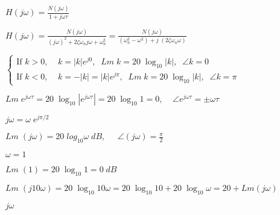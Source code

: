 \documentclass{article}
\def\lthtmlcheckvsize{\ifdim\ht\sizebox<\vsize 
  \ifdim\wd\sizebox<\hsize\expandafter\hfill\fi \expandafter\vfill
  \else\expandafter\vss\fi}%
\begin{document}
{\newpage\clearpage
{}%
$\displaystyle H(j\omega)=\frac{N(j\omega)}{1+j\omega \tau} $%
\lthtmlindisplaymathZ
\lthtmlcheckvsize\clearpage}

{\newpage\clearpage
{}%
$\displaystyle H(j\omega)=\frac{N(j\omega)}{(j\omega)^2+2\zeta\omega_n j\omega +\omega_n^2}
=\frac{N(j\omega)}{(\omega_n^2-\omega^2)+j\;(2\zeta\omega_n \omega) }$%
\lthtmlindisplaymathZ
\lthtmlcheckvsize\clearpage}

{\newpage\clearpage
{}%
$\displaystyle \left\{ \begin{array}{l}
    \mbox{If $k>0, \;\;\;\;k=|k|e^{j0}, \;\;Lm\;k=20 \;\log_{10}|k|,\;\;\angle k=0$} \\
    \mbox{If $k<0, \;\;\;\;k=-|k|=|k|e^{j\pi}, \;\;Lm\;k=20\;\log_{10}|k|,\;\;\angle k=\pi$} 
    \end{array} \right. $%
\lthtmlindisplaymathZ
\lthtmlcheckvsize\clearpage}

{\newpage\clearpage
{}%
$\displaystyle Lm \;e^{ j\omega \tau}=20\;\log_{10} |e^{ j\omega \tau}|=20\;\log_{10} 1=0,\;\;\;\;
  \angle e^{ j\omega \tau} =\pm \omega \tau $%
\lthtmlindisplaymathZ
\lthtmlcheckvsize\clearpage}

{\newpage\clearpage
{}%
$j\omega=\omega\; e^{j\pi/2}$%
\lthtmlindisplaymathZ
\lthtmlcheckvsize\clearpage}

{\newpage\clearpage
{}%
$\displaystyle Lm\; (j\omega)=20\; log_{10} \omega\;dB,\;\;\;\;\;\angle(j\omega)=\frac{\pi}{2} $%
\lthtmlindisplaymathZ
\lthtmlcheckvsize\clearpage}

{\newpage\clearpage
{}%
$\omega=1$%
\lthtmlindisplaymathZ
\lthtmlcheckvsize\clearpage}

{\newpage\clearpage
{}%
$Lm \;(1) =20\; \log_{10} 1=0\;dB$%
\lthtmlindisplaymathZ
\lthtmlcheckvsize\clearpage}

{\newpage\clearpage
{}%
$\displaystyle Lm\; (j10\omega)=20\; \log_{10} 10\omega=20 \;\log_{10} 10+20\;\log_{10}\omega 
    =20+Lm(j\omega) $%
\lthtmlindisplaymathZ
\lthtmlcheckvsize\clearpage}

{\newpage\clearpage
{}%
$j\omega$%
\lthtmlindisplaymathZ
\lthtmlcheckvsize\clearpage}
\end{document}
